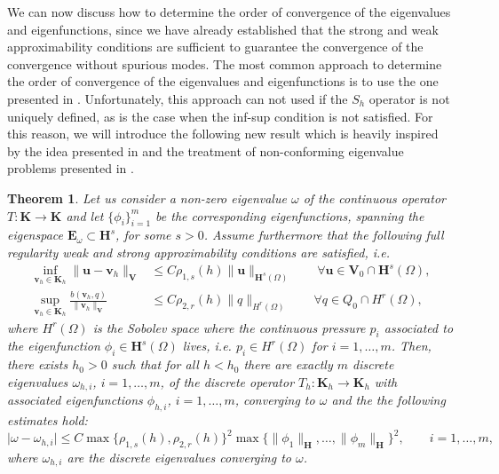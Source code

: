 \documentclass[USenglish]{article}
\theoremstyle{dgthm}
\newtheorem{theorem}{Theorem}
\theoremstyle{dgdef}
\let\vec\bm
\newcommand\norm[1]{\lVert#1\rVert}
\newcommand\abs[1]{\lvert#1\rvert}
\begin{document}
We can now discuss how to determine the order of convergence of the eigenvalues and eigenfunctions, since we have already established that the strong and weak approximability conditions are sufficient to guarantee the convergence of the convergence without spurious modes.
The most common approach to determine the order of convergence of the eigenvalues and eigenfunctions is to use the one presented in \cite{MercierOsbornRappazRaviart}.
Unfortunately, this approach can not used if the $S_h$ operator is not uniquely defined, as is the case when the inf-sup condition is not satisfied.
For this reason, we will introduce the following new result which is heavily inspired by the idea presented in \cite{BBG} and the treatment of non-conforming eigenvalue problems presented in \cite{BoffiActa}.
\begin{theorem}
  Let us consider a non-zero eigenvalue $\omega$ of the continuous operator $T:\vec{K}\to\vec{K}$ and let $\{\phi_i\}_{i=1}^{m}$ be the corresponding eigenfunctions, spanning the eigenspace $\vec{E}_\omega\subset \vec{H}^s$, for some $s>0$.
  Assume furthermore that the following full regularity weak and strong approximability conditions are satisfied, i.e.
  \begin{align}
    \underset{\vec{v}_h\in \vec{K}_h}{\inf} \norm{\vec{u}-\vec{v}_h}_{\vec{V}} &\leq C \rho_{1,s}(h)\norm{\vec{u}}_{\vec{H}^s(\Omega)}\qquad \forall \vec{u}\in \vec{V}_0\cap \vec{H}^s(\Omega),\\
  \underset{\vec{v}_h\in \vec{K}_h}{\sup} \frac{b(\vec{v}_h,q)}{\norm{\vec{v}_h}_{\vec{V}}} &\leq C \rho_{2,r}(h)\norm{q}_{H^{r}(\Omega)} \qquad \forall q\in Q_0\cap H^{r}(\Omega),
  \end{align}
  where $H^r(\Omega)$ is the Sobolev space where the continuous pressure $p_i$ associated to the eigenfunction $\phi_i\in \vec{H}^s(\Omega)$ lives, i.e. $p_i\in H^r(\Omega)$ for $i=1,\ldots,m$.
  Then, there exists $h_0>0$ such that for all $h<h_0$ there are exactly $m$ discrete eigenvalues $\omega_{h,i}$, $i=1,\ldots,m$, of the discrete operator $T_h:\vec{K}_h\to \vec{K}_h$ with associated eigenfunctions $\phi_{h,i}$, $i=1,\ldots,m$, converging to $\omega$ and
  the the following estimates hold:
  \begin{equation}
    \abs{\omega-\omega_{h,i}}\leq C \max\{\rho_{1,s}(h),\rho_{2,r}(h)\}^2\max\{\norm{\phi_1}_{\vec{H}},\ldots,\norm{\phi_m}_{\vec{H}}\}^2, \qquad i=1,\ldots,m, 
  \end{equation}
  where $\omega_{h,i}$ are the discrete eigenvalues converging to $\omega$.
\end{theorem}
\end{document}
